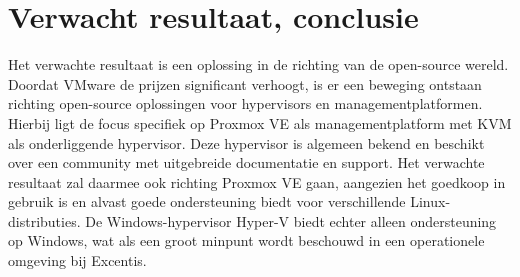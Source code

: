 




\section{Verwacht resultaat, conclusie}%
\label{sec:verwachte_resultaten}

Het verwachte resultaat is een oplossing in de richting van de open-source wereld. Doordat VMware de prijzen significant verhoogt, is er een beweging ontstaan richting open-source oplossingen voor hypervisors en managementplatformen.
Hierbij ligt de focus specifiek op Proxmox VE als managementplatform met KVM als onderliggende hypervisor. Deze hypervisor is algemeen bekend en beschikt over een community met uitgebreide documentatie en support.
Het verwachte resultaat zal daarmee ook richting Proxmox VE gaan, aangezien het goedkoop in gebruik is en alvast goede ondersteuning biedt voor verschillende Linux-distributies.
De Windows-hypervisor Hyper-V biedt echter alleen ondersteuning op Windows, wat als een groot minpunt wordt beschouwd in een operationele omgeving bij Excentis.

